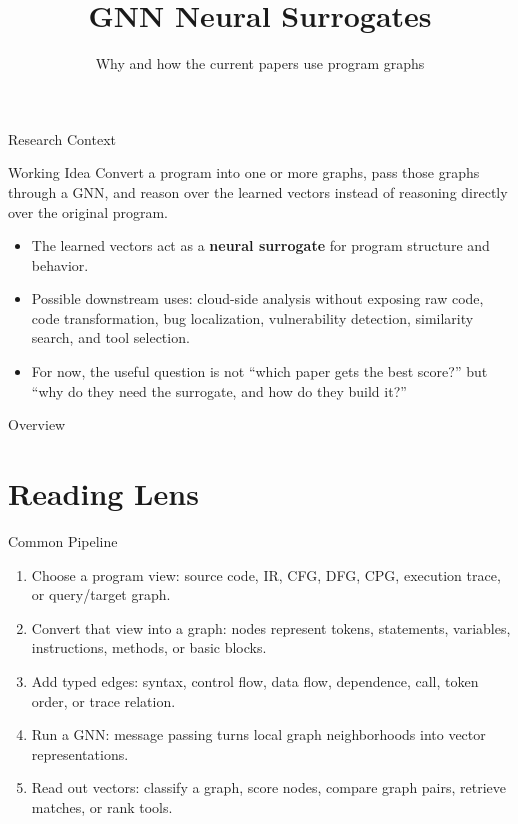 \documentclass[10pt]{beamer}
\title{GNN Neural Surrogates}
\subtitle{Why and how the current papers use program graphs}
\author{}
\institute{}
\date{}
\begin{document}
\maketitle

\begin{frame}{Research Context}
  \begin{block}{Working Idea}
    Convert a program into one or more graphs, pass those graphs through a GNN, and reason over the learned vectors instead of reasoning directly over the original program.
  \end{block}

  \begin{itemize}
    \item The learned vectors act as a \textbf{neural surrogate} for program structure and behavior.
    \item Possible downstream uses: cloud-side analysis without exposing raw code, code transformation, bug localization, vulnerability detection, similarity search, and tool selection.
    \item For now, the useful question is not ``which paper gets the best score?'' but ``why do they need the surrogate, and how do they build it?''
  \end{itemize}
\end{frame}

\begin{frame}{Overview}
  \tableofcontents
\end{frame}

\section{Reading Lens}

\begin{frame}{Common Pipeline}
  \begin{enumerate}
    \item Choose a program view: source code, IR, CFG, DFG, CPG, execution trace, or query/target graph.
    \item Convert that view into a graph: nodes represent tokens, statements, variables, instructions, methods, or basic blocks.
    \item Add typed edges: syntax, control flow, data flow, dependence, call, token order, or trace relation.
    \item Run a GNN: message passing turns local graph neighborhoods into vector representations.
    \item Read out vectors: classify a graph, score nodes, compare graph pairs, retrieve matches, or rank tools.
  \end{enumerate}
\end{frame}
\end{document}
